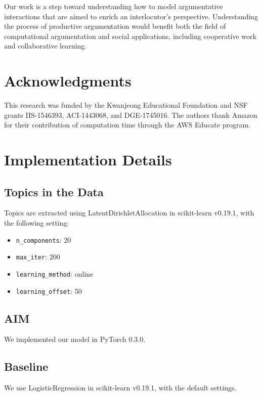 \documentclass[11pt,a4paper]{article}
\begin{document}
Our work is a step toward understanding how to model argumentative interactions that are aimed to enrich an interlocutor's perspective. Understanding the process of productive argumentation would benefit both the field of computational argumentation and social applications, including cooperative work and collaborative learning.



\section*{Acknowledgments}
This research was funded by the Kwanjeong Educational Foundation and NSF grants IIS-1546393, ACI-1443068, and DGE-1745016. The authors thank Amazon for their contribution of computation time through the AWS Educate program.

%



\appendix

\section{Implementation Details\label{app:implementation}}

\subsection{Topics in the Data}
Topics are extracted using \textsf{LatentDirichletAllocation} in \textsf{scikit-learn v0.19.1}, with the following setting:
\begin{itemize}
\setlength\itemsep{0em}
    \item \texttt{n\_components}: 20
    \item \texttt{max\_iter}: 200
    \item \texttt{learning\_method}: online
    \item \texttt{learning\_offset}: 50
\end{itemize}


\subsection{AIM}
We implemented our model in \textsf{PyTorch 0.3.0}.

\subsection{Baseline}
We use \textsf{LogisticRegression} in \textsf{scikit-learn v0.19.1}, with the default settings.
\end{document}
